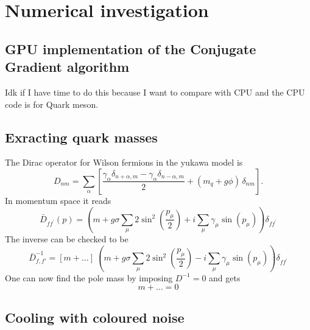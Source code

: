 \chapter{Numerical investigation}
\label{chapt:results}

\section{GPU implementation of the Conjugate Gradient algorithm}
Idk if I have time to do this because I want to compare with CPU and the CPU code is for Quark meson.

\section{Exracting quark masses}

The Dirac operator for Wilson fermions in the yukawa model is
\begin{equation*}
D_{n m}=\sum_\alpha\left[\frac{\gamma_\alpha \delta_{n+\alpha, m} - \gamma_\alpha \delta_{n-\alpha, m}}{2} + (m_q + g \phi) \, \delta_{n m}\right] .
\end{equation*}
In momentum space it reads
\begin{equation*}
\bar{D}_{f f^{\prime}}(p)=\left(m+ g \sigma \sum_\mu 2 \sin ^2\left(\frac{p_\mu}{2}\right)+i \sum_\mu \gamma_\mu \sin \left(p_\mu\right)\right) \delta_{f f^{\prime}}
\end{equation*}
The inverse can be checked to be 
\begin{equation*}
    \bar D_{f,f'} ^{-1} = \left[m + \dots\right] \ \left(m+ g \sigma \sum_\mu 2 \sin ^2\left(\frac{p_\mu}{2}\right) - i \sum_\mu \gamma_\mu \sin \left(p_\mu\right)\right) \delta_{f f^{\prime}}
\end{equation*}
One can now find the pole mass by imposing $D^{-1} = 0$ and gets 
\begin{equation*}
    m + \dots = 0
\end{equation*}

\section{Cooling with coloured noise}

